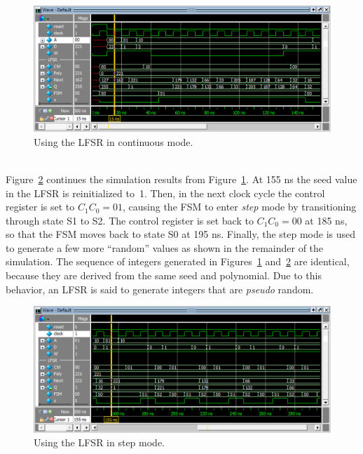 \documentclass[epsfig,10pt,fullpage]{article}
\begin{document}
\begin{enumerate}
~\\
\begin{figure}[h]
   \begin{center}
       \includegraphics[width=\textwidth]{figures/lfsr_cont.png}
   \end{center}
   \caption{Using the LFSR in continuous mode.}
	\label{fig:cont}
\end{figure}

~\\
\noindent
Figure~\ref{fig:step} continues the simulation results from Figure~\ref{fig:cont}. At 155 ns
the seed value in the LFSR is reinitialized to~1. Then, in the next clock cycle the control 
register is set to $C_1 C_0 = 01$, causing the FSM to enter {\it step} mode by transitioning 
through state S1 to S2. The control register is set back to $C_1 C_0 = 00$ at 185 ns, so that the
FSM moves back to state S0 at 195 ns. Finally, the step mode is used to generate a 
few more ``random'' values as shown in the remainder of the simulation. The sequence of 
integers generated in Figures~\ref{fig:cont} and~\ref{fig:step} are identical, because they 
are derived from the same seed and polynomial. Due to this behavior, an LFSR is said to 
generate integers that are {\it pseudo} random.

\begin{figure}[h]
   \begin{center}
       \includegraphics[width=\textwidth]{figures/lfsr_step.png}
   \end{center}
   \caption{Using the LFSR in step mode.}
	\label{fig:step}
\end{figure}
\end{enumerate}
\end{document}
